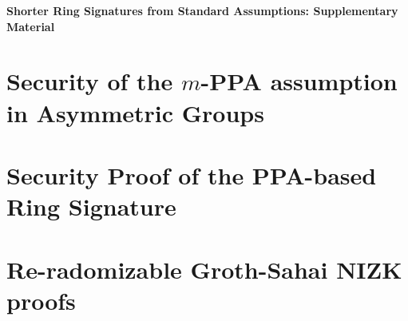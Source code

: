 \documentclass{llncs}
\begin{document}





\newpage
\appendix

\begin{center}\begin{Large}{\bf
Shorter Ring Signatures from Standard Assumptions: Supplementary Material
}\end{Large}\end{center}
\vspace{1cm}

	\section{Security of the $m$-PPA assumption in Asymmetric Groups} \label{sec:aPPA}
	
		
		

		
		
	\section{Security Proof of the PPA-based Ring Signature} \label{sec:ppa-sec-proof}
	
			


	\section{Re-radomizable Groth-Sahai NIZK proofs} \label{sec:GSproofs-hg}
	
\end{document}
